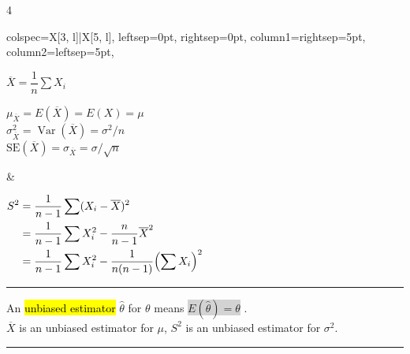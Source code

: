 \documentclass[12pt]{article}
\newcommand{\hlfancy}[2]{\sethlcolor{#1}\hl{#2}}
\newcommand{\hlfancytall}[2]{%
    \begingroup
    \setlength{\fboxsep}{0pt}%
    \colorbox{#1}{#2}%
    \endgroup
}
\DeclareMathOperator{\var}{Var}
\let\originalleft\left
\let\originalright\right
\renewcommand{\left}{\mathopen{}\mathclose\bgroup\originalleft}
\renewcommand{\right}{\aftergroup\egroup\originalright}
\begin{document}
\setcolumnwidth{385pt,385pt,550pt,}
\begin{paracol}{4}
	\begin{tcolorbox}[title=Sampling Distributions, width=385pt,
			reset and store to box array=breakwrap]
		\begin{tblr}{
				colspec={X[3, l]|X[5, l]},
				leftsep=0pt,
				rightsep=0pt,
				column{1}={rightsep=5pt},
				column{2}={leftsep=5pt},
			}
			\begin{minipage}[t]{\linewidth}
				$\overline{X} = \dfrac{1}{n}\displaystyle\sum X_i$

				\vspace{\baselineskip}
				$\mu_{\overline{X}} = E(\overline{X}) = E(X) = \mu$ \\
				$\sigma_{\overline{X}}^2 = \var(\overline{X}) = \sigma^2/n$ \\
				$\mathrm{SE}(\overline{X}) = \sigma_{\overline{X}} = \sigma/\sqrt{n}$
			\end{minipage}
			 &
			\begin{minipage}[t]{\linewidth}
				$\begin{aligned}[t]
						S^2 & = \dfrac{1}{n-1}\sum (X_i - \overline{X})^2 \\
						    & = \dfrac{1}{n-1}\sum X_i^2
						- \dfrac{n}{n-1}\overline{X}^2                    \\
						    & = \dfrac{1}{n-1}\sum X_i^2
						- \dfrac{1}{n(n-1)}\left(\sum X_i\right)^2
					\end{aligned}$
			\end{minipage}
		\end{tblr}

		\vspace*{4pt}\hrule\vspace*{4pt}

		An \hlfancy{lightgray}{unbiased estimator} $\hat{\theta}$ for $\theta$ means \hlfancytall{lightgray}{$E(\hat{\theta})=\theta$}. \\
		$\overline{X}$ is an unbiased estimator for $\mu$, $S^2$ is an unbiased estimator for $\sigma^2$.

		\vspace*{1pt}\hrule\vspace*{1pt}


\end{tcolorbox}
\end{paracol}
\end{document}
